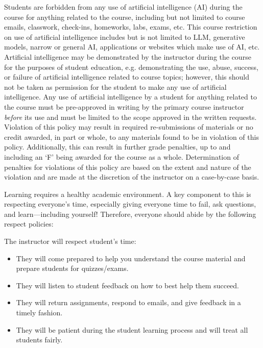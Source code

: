\documentclass[11pt,letterpaper]{article}
\begin{document}

Students are forbidden from any use of artificial intelligence (AI) during the course for anything related to the course, including but not limited to course emails, classwork, check-ins, homeworks, labs, exams, etc. This course restriction on use of artificial intelligence includes but is not limited to LLM, generative models, narrow or general AI, applications or websites which make use of AI, etc. Artificial intelligence may be demonstrated by the instructor during the course for the purposes of student education, e.g. demonstrating the use, abuse, success, or failure of artificial intelligence related to course topics; however, this should not be taken as permission for the student to make any use of artificial intelligence. Any use of artificial intelligence by a student for anything related to the course must be pre-approved in writing by the primary course instructor \textit{before} its use and must be limited to the scope approved in the written requests. Violation of this policy may result in required re-submissions of materials or no credit awarded, in part or whole, to any materials found to be in violation of this policy. Additionally, this can result in further grade penalties, up to and including an `F' being awarded for the course as a whole. Determination of penalties for violations of this policy are based on the extent and nature of the violation and are made at the discretion of the instructor on a case-by-case basis. 
\par\vspace{0.5cm}




Learning requires a healthy academic environment. A key component to this is respecting everyone's time, especially giving everyone time to fail, ask questions, and learn---including yourself! Therefore, everyone should abide by the following respect policies: \par\vspace{0.3cm}

The instructor will respect student's time:
	\begin{itemize} \itemsep=0.2ex
	\item They will come prepared to help you understand the course material and prepare students for quizzes/exams. 
	\item They will listen to student feedback on how to best help them succeed. 
	\item They will return assignments, respond to emails, and give feedback in a timely fashion. 
	\item They will be patient during the student learning process and will treat all students fairly. 
	\end{itemize} \pspace
\end{document}

